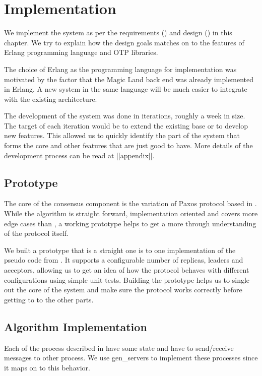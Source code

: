 \chapter{Implementation}
\label{chapter:implementation}

We implement the system as per the requirements () and
design () in this chapter. We try to explain how the
design goals matches on to the features of Erlang \citep{erlang} programming
language and OTP libraries.

The choice of Erlang as the programming language for implementation was
motivated by the factor that the Magic Land back end was already implemented in
Erlang. A new system in the same language will be much easier to integrate with
the existing architecture.

The development of the system was done in iterations, roughly a week in size.
The target of each iteration would be to extend the existing base or to develop
new features. This allowed us to quickly identify the part of the system that
forms the core and other features that are just good to have. More details of
the development process can be read at [[appendix]].

\section{Prototype}

The core of the consensus component is the variation of Paxos protocol based
in \citet{Robbert2011}. While the algorithm is straight forward, implementation
oriented and covers more edge cases than \citet{Lamport01}, a working prototype
helps to get a more through understanding of the protocol itself.

We built a prototype that is a straight one is to one implementation of the
pseudo code from \citet{Robbert2011}. It supports a configurable number of
replicas, leaders and acceptors, allowing us to get an idea of how the protocol
behaves with different configurations using simple unit tests. Building the
prototype helps us to single out the core of the system and make sure the
protocol works correctly before getting to to the other parts.

\section{Algorithm Implementation}

Each of the process described in  have some state
and have to send/receive messages to other process. We use gen\_servers
 to implement these processes since it maps on to
this behavior.

